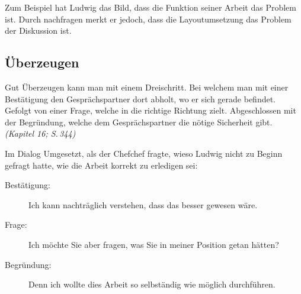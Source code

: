 Zum Beispiel hat Ludwig das Bild, dass die Funktion seiner
Arbeit das Problem ist. Durch nachfragen merkt er jedoch, dass die
Layoutumsetzung das Problem der Diskussion ist.

\subsection*{Überzeugen}
Gut Überzeugen kann man mit einem Dreischritt.  Bei welchem man mit
einer Bestätigung den Gesprächspartner dort abholt, wo er sich gerade
befindet.  Gefolgt von einer Frage, welche in die richtige Richtung
zielt.  Abgeschlossen mit der Begründung, welche dem Gesprächspartner
die nötige Sicherheit gibt. \emph{(Kapitel 16; S.\,344)}

Im Dialog Umgesetzt, als der Chefchef fragte, wieso Ludwig nicht zu
Beginn gefragt hatte, wie die Arbeit korrekt zu erledigen sei:
\begin{description}
  \item[Bestätigung:] Ich kann nachträglich verstehen, dass das besser
    gewesen wäre.
  \item[Frage:] Ich möchte Sie aber fragen, was Sie in meiner Position
    getan hätten?
  \item[Begründung:] Denn ich wollte dies Arbeit so selbständig wie
    möglich durchführen.
\end{description}




